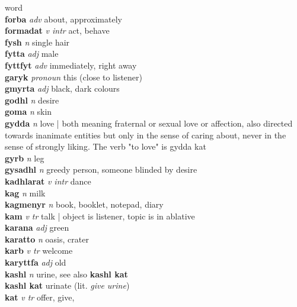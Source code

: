 \textperiodcentered word\\\textbf{forba}   \emph{adv} \textperiodcentered about, approximately\\\textbf{formadat}   \emph{v intr} \textperiodcentered act, behave\\\textbf{fysh}   \emph{n} \textperiodcentered single hair\\\textbf{fytta}   \emph{adj} \textperiodcentered male\\\textbf{fyttfyt}   \emph{adv} \textperiodcentered immediately, right away\\\textbf{garyk}   \emph{pronoun} \textperiodcentered this (close to listener)\\\textbf{gmyrta}   \emph{adj} \textperiodcentered black, dark colours\\\textbf{godhl}   \emph{n} \textperiodcentered desire\\\textbf{goma}   \emph{n} \textperiodcentered skin\\\textbf{gydda}   \emph{n} \textperiodcentered love | both meaning fraternal or sexual love or affection, also directed towards inanimate entities but only in the sense of caring about, never in the sense of strongly liking. The verb "to love" is gydda kat\\\textbf{gyrb}   \emph{n} \textperiodcentered leg\\\textbf{gysadhl}   \emph{n} \textperiodcentered greedy person, someone blinded by desire\\\textbf{kadhlarat}   \emph{v intr} \textperiodcentered dance\\\textbf{kag}   \emph{n} \textperiodcentered milk\\\textbf{kagmenyr}   \emph{n} \textperiodcentered book, booklet, notepad, diary\\\textbf{kam}   \emph{v tr} \textperiodcentered talk | object is listener, topic is in ablative\\\textbf{karana}   \emph{adj} \textperiodcentered green\\\textbf{karatto}   \emph{n} \textperiodcentered oasis, crater\\\textbf{karb}   \emph{v tr} \textperiodcentered welcome\\\textbf{karyttfa}   \emph{adj} \textperiodcentered old\\\textbf{kashl}   \emph{n} \textperiodcentered urine, see also \textbf{kashl kat}\\\textbf{kashl kat}    \textperiodcentered urinate (lit. \emph{give urine})\\\textbf{kat}   \emph{v tr} \textperiodcentered offer, give, 